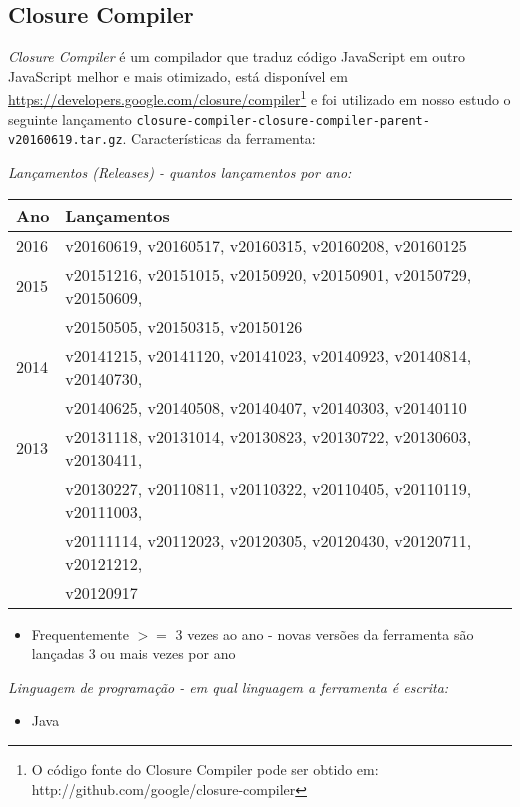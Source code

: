 \subsection{Closure Compiler}

{\it Closure Compiler} é um compilador que traduz código JavaScript em outro
JavaScript melhor e mais otimizado, está disponível em
\url{https://developers.google.com/closure/compiler}\footnote{O código fonte do
Closure Compiler pode ser obtido em:
http://github.com/google/closure-compiler} e foi utilizado em nosso estudo o
seguinte lançamento
\texttt{closure-compiler-closure-compiler-parent-v20160619.tar.gz}.
Características da ferramenta:

\begin{description}

  \item {\it Lançamentos ({\it Releases}) - quantos lançamentos por ano:}
    \begin{table}[h!]
      \centering
      \begin{tabular}{| l | l |}
        \hline
        Ano  & Lançamentos                              \\
        \hline
        2016 & v20160619, v20160517, v20160315, v20160208, v20160125 \\
        2015 & v20151216, v20151015, v20150920, v20150901, v20150729, v20150609, \\
             & v20150505, v20150315, v20150126 \\
        2014 & v20141215, v20141120, v20141023, v20140923, v20140814, v20140730, \\
             & v20140625, v20140508, v20140407, v20140303, v20140110 \\
        2013 & v20131118, v20131014, v20130823, v20130722, v20130603, v20130411, \\
             & v20130227, v20110811, v20110322, v20110405, v20110119, v20111003, \\
             & v20111114, v20112023, v20120305, v20120430, v20120711, v20121212, \\
             & v20120917 \\
        \hline
      \end{tabular}
    \end{table}
    \begin{itemize}
      \item Frequentemente $>=$ 3 vezes ao ano - novas versões da ferramenta são lançadas 3 ou mais vezes por ano
    \end{itemize}

  \item {\it Linguagem de programação - em qual linguagem a ferramenta é escrita:}
    \begin{itemize}
      \item Java
    \end{itemize}

\end{description}

